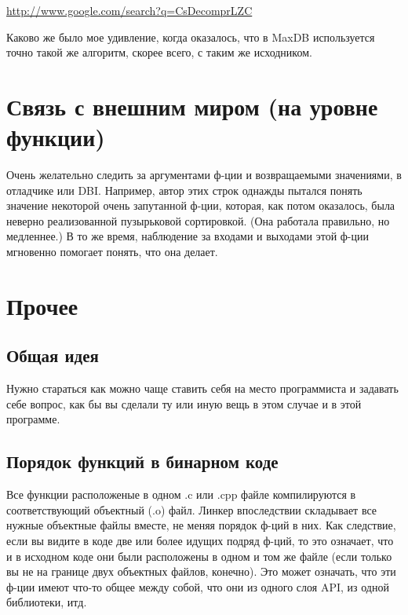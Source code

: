 \url{http://www.google.com/search?q=CsDecomprLZC}

Каково же было мое удивление, когда оказалось, что в MaxDB используется точно такой же алгоритм, 
скорее всего, с таким же исходником.



\section{Связь с внешним миром (на уровне функции)}
Очень желательно следить за аргументами ф-ции и возвращаемыми значениями, в отладчике или \ac{DBI}.
Например, автор этих строк однажды пытался понять значение некоторой очень запутанной ф-ции, которая, как потом оказалось,
была неверно реализованной пузырьковой сортировкой.
(Она работала правильно, но медленнее.)
В то же время, наблюдение за входами и выходами этой ф-ции мгновенно помогает понять, что она делает.








\section{Прочее}

\subsection{Общая идея}

Нужно стараться как можно чаще ставить себя на место программиста и задавать себе вопрос, 
как бы вы сделали ту или иную вещь в этом случае и в этой программе.

\subsection{Порядок функций в бинарном коде}

Все функции расположеные в одном .c или .cpp файле компилируются в соответствующий объектный (.o) файл.
Линкер впоследствии складывает все нужные объектные файлы вместе, не меняя порядок ф-ций в них.
Как следствие, если вы видите в коде две или более идущих подряд ф-ций, то это означает, что и в исходном коде они 
были расположены в одном и том же файле (если только вы не на границе двух объектных файлов, конечно).
Это может означать, что эти ф-ции имеют что-то общее между собой, что они из одного слоя \ac{API}, из одной библиотеки, итд.%

